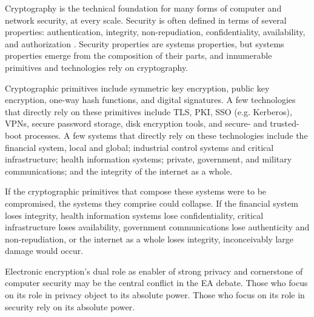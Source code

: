 Cryptography is the technical foundation for many forms of computer and network security, at every scale. Security is
often defined in terms of several properties: authentication, integrity, non-repudiation, confidentiality, availability,
and authorization \cite{shostack_threat_2014}. Security properties are systems properties, but systems properties emerge
from the composition of their parts, and innumerable primitives and technologies rely on cryptography.

Cryptographic primitives include symmetric key encryption, public key encryption, one-way hash functions, and digital
signatures. A few technologies that directly rely on these primitives include \ac{TLS}, \ac{PKI}, \ac{SSO} (e.g.
Kerberos), \acp{VPN}, secure password storage, disk encryption tools, and secure- and trusted-boot processes. A few
systems that directly rely on these technologies include the financial system, local and global; industrial control
systems and critical infrastructure; health information systems; private, government, and military communications; and
the integrity of the internet as a whole.




If the cryptographic primitives that compose these systems were to be compromised, the systems they comprise could
collapse. If the financial system loses integrity, health information systems lose confidentiality, critical
infrastructure loses availability, government communications lose authenticity and non-repudiation, or the internet as a
whole loses integrity, inconceivably large damage would occur.

Electronic encryption's dual role as enabler of strong privacy and cornerstone of computer security may be the central
conflict in the EA debate. Those who focus on its role in privacy object to its absolute power. Those who focus on its
role in security rely on its absolute power.

